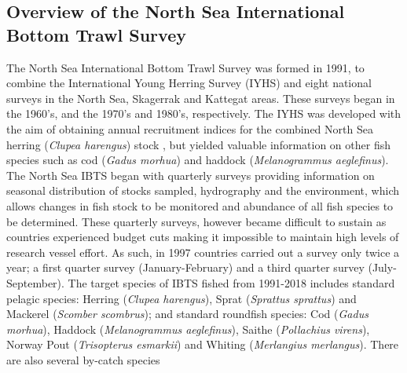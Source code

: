 \documentclass[a4paper 12pt]{article}
\numberwithin{equation}{section}
\begin{document}
\subsection{Overview of the North Sea International Bottom Trawl Survey}
\label{overview}
\indent The North Sea International Bottom Trawl Survey was formed in 1991, to combine the International Young Herring Survey (IYHS) and eight national surveys in the North Sea, Skagerrak and Kattegat areas. These surveys began in the 1960's, and the 1970's and 1980's, respectively. The IYHS was developed with the aim of obtaining annual recruitment indices for the combined North Sea herring (\textit{Clupea harengus}) stock \citep{ICES2012}, but yielded valuable information on other fish species such as cod (\textit{Gadus morhua}) and haddock (\textit{Melanogrammus aeglefinus}).\\
\indent The North Sea IBTS began with quarterly surveys providing information on seasonal distribution of stocks sampled, hydrography and the environment, which allows changes in fish stock to be monitored and abundance of all fish species to be determined. These quarterly surveys, however became difficult to sustain as countries experienced budget cuts making it impossible to maintain high levels of research vessel effort. As such, in 1997 countries carried out a survey only twice a year; a first quarter survey (January-February) and a third quarter survey (July-September). The target species of IBTS fished from 1991-2018 includes standard pelagic species: Herring (\textit{Clupea harengus}), Sprat (\textit{Sprattus sprattus}) and Mackerel (\textit{Scomber scombrus}); and standard roundfish species: Cod (\textit{Gadus morhua}), Haddock (\textit{Melanogrammus aeglefinus}), Saithe (\textit{Pollachius virens}),  Norway Pout (\textit{Trisopterus esmarkii})  and Whiting (\textit{Merlangius merlangus}). There are also several by-catch species \citep[see for example,][]{ICES2006Report}
\end{document}
